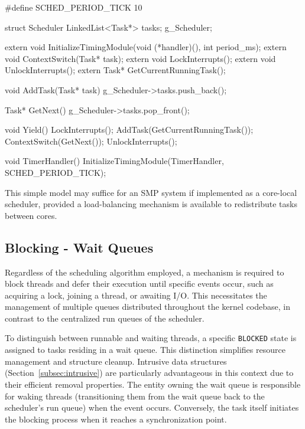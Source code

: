 \documentclass[a4paper,10pt,twoside]{report}
\theoremstyle{definition}
\begin{document}
\clearpage

\begin{cppcode}[caption={Round Robin Pseudocode}, label={lst:rr_pseudo_code}]
#define SCHED_PERIOD_TICK 10

struct Scheduler {
    LinkedList<Task*> tasks{};
} g_Scheduler;

extern void InitializeTimingModule(void (*handler)(), int period_ms);
extern void ContextSwitch(Task* task);
extern void LockInterrupts();
extern void UnlockInterrupts();
extern Task* GetCurrentRunningTask();

void AddTask(Task* task) {
    g_Scheduler->tasks.push_back();
}

Task* GetNext() {
    g_Scheduler->tasks.pop_front();
}

void Yield() {
    LockInterrupts();
    AddTask(GetCurrentRunningTask());
    ContextSwitch(GetNext());
    UnlockInterrupts();
}

void TimerHandler() {
    InitializeTimingModule(TimerHandler, SCHED_PERIOD_TICK);
}
\end{cppcode}

This simple model may suffice for an SMP system if implemented as a core-local scheduler, provided a load-balancing mechanism is available to redistribute tasks between cores.

\subsection{Blocking - Wait Queues}
\label{subsec:wait_queue}

Regardless of the scheduling algorithm employed, a mechanism is required to block threads and defer their execution until specific events occur, such as acquiring a lock, joining a thread, or awaiting I/O. This necessitates the management of multiple queues distributed throughout the kernel codebase, in contrast to the centralized run queues of the scheduler.

To distinguish between runnable and waiting threads, a specific \texttt{BLOCKED} state is assigned to tasks residing in a wait queue. This distinction simplifies resource management and structure cleanup. Intrusive data structures (Section~\ref{subsec:intrusive}) are particularly advantageous in this context due to their efficient removal properties. The entity owning the wait queue is responsible for waking threads (transitioning them from the wait queue back to the scheduler's run queue) when the event occurs. Conversely, the task itself initiates the blocking process when it reaches a synchronization point.
\end{document}
